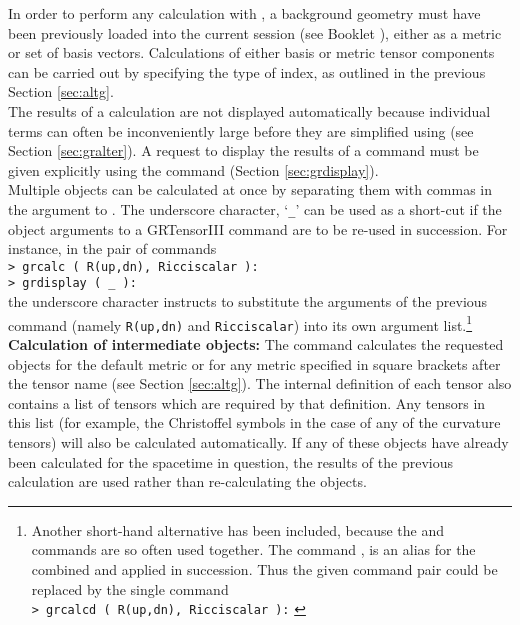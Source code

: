 \documentclass{article}
\begin{document}
In order to perform any calculation with , a background
geometry must have been previously loaded into the current session
(see Booklet \grMakegRef), either as a metric or set of basis
vectors. Calculations of either basis or metric tensor components can
be carried out by specifying the type of index, as outlined in the
previous Section \ref{sec:altg}.\\

The results of a calculation are not displayed automatically because
individual terms can often be inconveniently large before they are
simplified using  (see Section \ref{sec:gralter}). A
request to display the results of a  command must be
given explicitly using the command  (Section 
\ref{sec:grdisplay}).\\

Multiple objects can be calculated at once by separating them with
commas in the argument to . The underscore character,
`\texttt{\_}' can be used as a short-cut if the object arguments to
a GRTensorIII command are to be re-used in succession. For instance,
in the pair of commands\\

\noindent\texttt{> grcalc ( R(up,dn), Ricciscalar ):} \\
\texttt{> grdisplay ( \_ ):} \\

\noindent the underscore character instructs  to
substitute the arguments of the previous  command
(namely \texttt{R(up,dn)} and \texttt{Ricciscalar}) into its own
argument list.\footnote{Another short-hand alternative has been
included, because the  and  commands
are so often used together.  The command , is an alias
for the combined  and  applied in
succession. Thus the given command pair could be replaced by the
single command\\

\noindent\texttt{> grcalcd ( R(up,dn), Ricciscalar ):}
\label{spec:grcalcd}}\\

\noindent\textbf{Calculation of intermediate objects:}
The  command calculates the requested objects for the
default metric or for any metric specified in square brackets
after the tensor name (see Section \ref{sec:altg}). The internal
definition of each tensor also contains a list of tensors which
are required by that definition. Any tensors in this list (for
example, the Christoffel symbols in the case of any of the
curvature tensors) will also be calculated automatically. If any of
these objects have already been calculated for the spacetime in
question, the results of the previous calculation are used rather
than re-calculating the objects.\\
\end{document}
